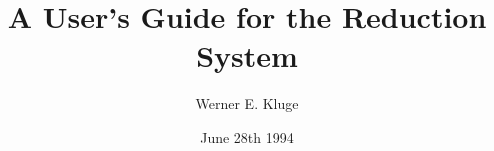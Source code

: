 \load{\normalsize}{\sc}

\makeindex


\title{A User's Guide for the Reduction System \pired}
\author{Werner E. Kluge}
\date{June 28th 1994}
\maketitle
\newpage
{}
\tableofcontents
\setcounter{page}{0}
\newpage
\newpage

\setcounter{section}{1}












\clearpage
{}
\printindex


